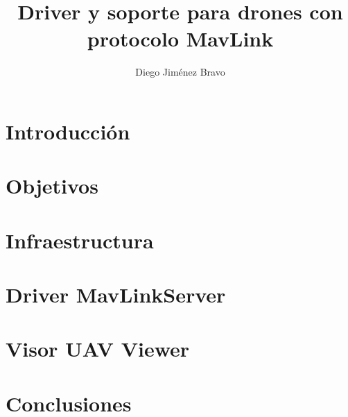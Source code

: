 \documentclass{new_cit_thesis}
\begin{document}
\title{Driver y soporte para drones con protocolo MavLink}
\author{Diego Jiménez Bravo}
\address{Tutor: Jose Maria Cañas Plaza} 
\copyyear{\the\year}                               
\pubnum{}                                          
\dedication{}  		   


\maketitle
\cleardoublepage



\cleardoublepage


\cleardoublepage


\cleardoublepage
\pagestyle{plain}
\chapter{Introducción}


\cleardoublepage
\chapter{Objetivos}


\cleardoublepage
\chapter{Infraestructura}


\cleardoublepage
\chapter{Driver MavLinkServer}


\cleardoublepage
\chapter{Visor UAV Viewer}


\cleardoublepage
\chapter{Conclusiones}


\cleardoublepage

\end{document}

